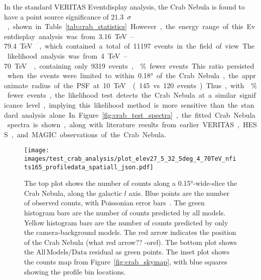   In the standard VERITAS Eventdisplay analysis, the Crab Nebula is found to have a point source significance of \SI{21.3}{$\sigma$}, shown in Table~\ref{tab:crab_statistics}.
  However, the energy range of this Eventdisplay analysis was from \SIrange{3.16}{79.4}{\TeV{}}, which contained a total of 11197 events in the field of view.
  The likelihood analysis was from \SIrange{4}{70}{\TeV{}}, containing only 9319 events, \% fewer events.
  This ratio persisted when the events were limited to within \ang{0.18} of the Crab Nebula, the approximate radius of the PSF at \SI{10}{\TeV{}} (145 vs 120 events).
  Thus, with \% fewer events, the likelihood test detects the Crab Nebula at a similar significance level, implying this likelihood method is more sensitive than the standard analysis alone.
  In Figure~\ref{fig:crab_test_spectra}, the fitted Crab Nebula spectra is shown, along with literature results from earlier VERITAS, HESS, and MAGIC observations of the Crab Nebula.
  
  \begin{figure}[p]
    \centering
    \texttt{[image: images/test\_crab\_analysis/plot\_elev27\_5\_32\_5deg\_4\_70TeV\_nfits165\_profiledata\_spatiall\_json.pdf]}
    \caption[Crab Nebula Profile along Galactic $l$]
    {
      The top plot shows the number of counts along a \ang{0.15}-wide-slice the Crab Nebula, along the galactic $l$ axis.
      Blue points are the number of observed counts, with Poissonian error bars~\cite{poissonfrequentistinterval}.
      The green histogram bars are the number of counts predicted by all models.
      Yellow histogram bars are the number of counts predicted by only the camera-background models.
      The red arrow indicates the position of the Crab Nebula {\color{red}(what red arrow?? -orel)}.
      The bottom plot shows the $\mathrm{All\,Models}/\mathrm{Data}$ residual as green points.
      The inset plot shows the counts map from Figure~\ref{fig:crab_skymap}, with blue squares showing the profile bin locations.
    }
    \label{fig:crab_profile_l}
  \end{figure}

